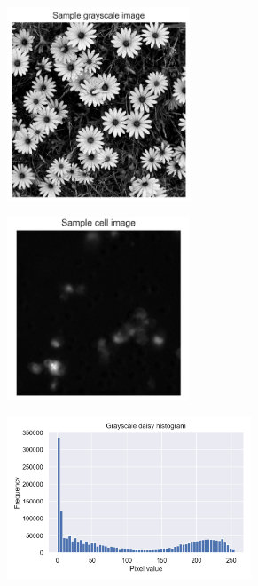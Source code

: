\begin{figure}[h]
    \centering
    \begin{subfigure}{0.45\textwidth}
        \centering
        \includegraphics[width=0.6\textwidth]{dissertation/figures/sample_grayscale.jpg}
    \end{subfigure}
    \begin{subfigure}{0.45\textwidth}
        \centering
        \includegraphics[width=0.6\textwidth]{dissertation/figures/sample_cell.jpg}
    \end{subfigure}
    \begin{subfigure}{0.45\textwidth}
        \centering
        \includegraphics[width=0.8\textwidth]{dissertation/figures/grayscale_histogram.png}

\end{subfigure}
\end{figure}
